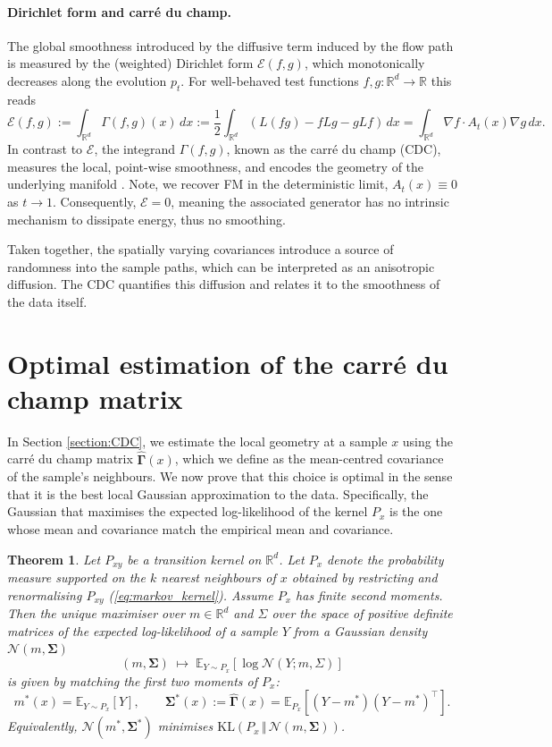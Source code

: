 \documentclass{article} %
\newcommand{\E}{\mathbb{E}}
\newcommand{\R}{\mathbb{R}}
\newtheorem{theorem}{Theorem}
\newcommand{\N}{\mathcal{N}}
\newcommand{\G}{\widehat{\mathbf{\Gamma}}}
\newcommand{\Si}{\mathbf{\Sigma}}
\begin{document}
\paragraph{Dirichlet form and carr\'{e} du champ.} 
The global smoothness introduced by the diffusive term induced by the flow path is measured by the (weighted) Dirichlet form $\mathcal{E}(f,g)$, which monotonically decreases along the evolution $p_t$. For well-behaved test functions $f,g:\R^d\to \R$ this reads
%
\begin{equation}\label{eq:dirichlet}
    \mathcal{E}(f,g):= \int_{\R^d} \Gamma(f,g)(x)\,dx := \frac{1}{2} \int_{\R^d}(L(fg) - fLg - gLf) \,dx = \int_{\R^d}\nabla f \cdot A_t(x)\nabla g\,dx.
\end{equation}
%
In contrast to $\mathcal{E}$, the integrand $\Gamma(f,g)$, known as the carr\'{e} du champ (CDC), measures the local, point-wise smoothness, and encodes the geometry of the underlying manifold \citep{jones2024diffusion}.
Note, we recover FM in the deterministic limit, $A_t(x)\equiv 0$ as $t\to 1$. Consequently, $\mathcal{E}=0$, meaning the associated generator has no intrinsic mechanism to dissipate energy, thus no smoothing.

Taken together, the spatially varying covariances introduce a source of randomness into the sample paths, which can be interpreted as an anisotropic diffusion. The CDC quantifies this diffusion and relates it to the smoothness of the data itself.

\section{Optimal estimation of the carr\'{e} du champ matrix}
\label{section:cdc_optimality}

In Section \ref{section:CDC}, we estimate the local geometry at a sample $x$ using the carr\'{e} du champ matrix $\G(x)$, which we define as the mean-centred covariance of the sample's neighbours. 
We now prove that this choice is optimal in the sense that it is the best local Gaussian approximation to the data.
Specifically, the Gaussian that maximises the expected log-likelihood of the kernel $P_x$ is the one whose mean and covariance match the empirical mean and covariance.

\begin{theorem} \label{optimalGM}
Let $P_{xy}$ be a transition kernel on $\mathbb{R}^d$. Let $P_x$ denote the probability measure supported on the $k$ nearest neighbours of $x$ obtained by restricting and renormalising $P_{xy}$ (\ref{eq:markov_kernel}).
Assume $P_x$ has finite second moments.
Then the unique maximiser over $m\in\mathbb{R}^d$ and $\Sigma$ over the space of positive definite matrices of the expected log-likelihood of a sample $Y$ from a Gaussian density \( \N(m, \Si) \)
\[
(m,\Si) \;\longmapsto\; \E_{Y\sim P_x}\!\left[\log \mathcal{N}(Y; m,\Sigma)\right]
\]
is given by matching the first two moments of \( P_x \):
\[
m^*(x)=\E_{Y\sim P_x}[Y],
\qquad
\Si^*(x):= \G(x) = \E_{P_x}\!\left[(Y-m^*)(Y-m^*)^\top\right].
\]
Equivalently, $\mathcal{N}(m^*,\Si^*)$ minimises $\mathrm{KL}(P_x\,\Vert\,\mathcal{N}(m,\Si))$.

\end{theorem}
\end{document}
